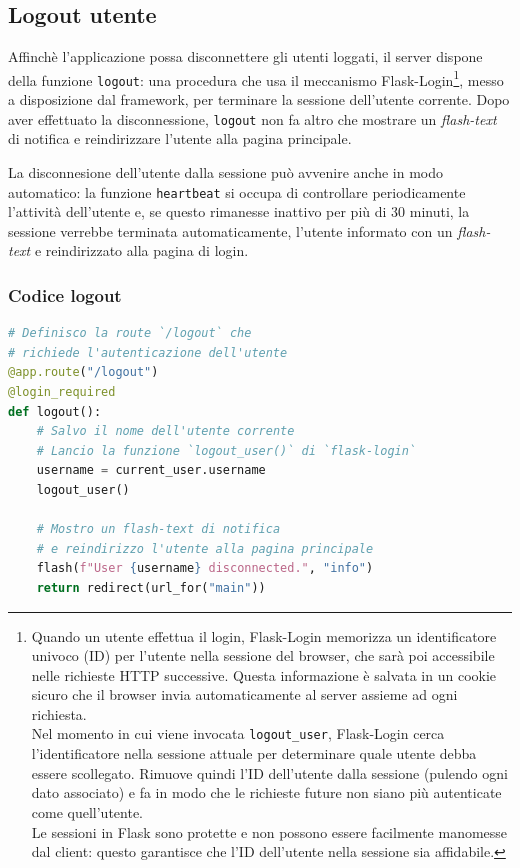 \documentclass[12pt]{report}
\newcommand{\flask}{\textsl{Flask}\xspace}
\newcommand{\http}{\textsf{HTTP}\xspace}
\begin{document}
\subsection{Logout utente}
Affinchè l'applicazione possa disconnettere gli utenti loggati, il server dispone della funzione \texttt{logout}: una procedura che usa il meccanismo \textsf{Flask-Login}\footnote{Quando un utente effettua il login, \textsf{Flask-Login} memorizza un identificatore univoco (\textsf{ID}) per l'utente nella sessione del browser, che sarà poi accessibile nelle richieste \http successive. Questa informazione è salvata in un cookie sicuro che il browser invia automaticamente al server assieme ad ogni richiesta.\\
Nel momento in cui viene invocata \texttt{logout\_user}, \textsf{Flask-Login} cerca l'identificatore nella sessione attuale per determinare quale utente debba essere scollegato. Rimuove quindi l'\textsf{ID} dell'utente dalla sessione (pulendo ogni dato associato) e fa in modo che le richieste future non siano più autenticate come quell'utente.\\
Le sessioni in Flask sono protette e non possono essere facilmente manomesse dal client: questo garantisce che l'\textsf{ID} dell'utente nella sessione sia affidabile.}, messo a disposizione dal framework, per terminare la sessione dell'utente corrente. Dopo aver effettuato la disconnessione, \texttt{logout} non fa altro che mostrare un \textit{flash-text} di notifica e reindirizzare l'utente alla pagina principale.

La disconnesione dell'utente dalla sessione può avvenire anche in modo automatico: la funzione \texttt{heartbeat} si occupa di controllare periodicamente l'attività dell'utente e, se questo rimanesse inattivo per più di 30 minuti, la sessione verrebbe terminata automaticamente, l'utente informato con un \textit{flash-text} e reindirizzato alla pagina di login.


\subsubsection{Codice logout}
\begin{lstlisting}[language=Python]
# Definisco la route `/logout` che
# richiede l'autenticazione dell'utente
@app.route("/logout")
@login_required
def logout():
    # Salvo il nome dell'utente corrente
    # Lancio la funzione `logout_user()` di `flask-login`
    username = current_user.username
    logout_user()

    # Mostro un flash-text di notifica
    # e reindirizzo l'utente alla pagina principale
    flash(f"User {username} disconnected.", "info")
    return redirect(url_for("main"))
\end{lstlisting}
\end{document}
